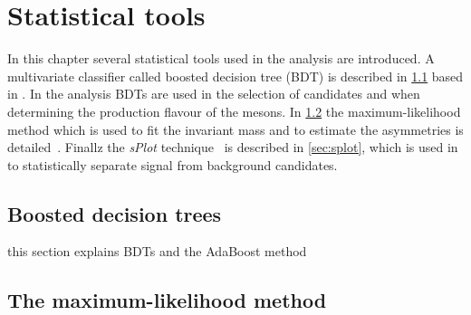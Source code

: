\chapter{Statistical tools}
\label{chap:tools}

\linespread{1.08}\selectfont
In this chapter several statistical tools used in the analysis are introduced.
A multivariate classifier called boosted decision tree (BDT) is described in \cref{sec:BDT} based in \cite{QuelleBDT}. In the analysis BDTs are used in the selection of \BdToDpi candidates and when determining the production flavour of the \Bz mesons.
In \cref{sec:MLFit} the maximum-likelihood method which is used to fit the invariant \Bz mass and to estimate the \CP asymmetries is detailed~\cite{Bohm:389738}.
Finallz the \emph{sPlot} technique~\cite{Pivk:2004ty} is described in \cref{sec:splot}, which is used in to statistically separate signal from background candidates.

\section{Boosted decision trees}
\label{sec:BDT}

this section explains BDTs and the AdaBoost method


\section{The maximum-likelihood method}
\label{sec:MLFit}

